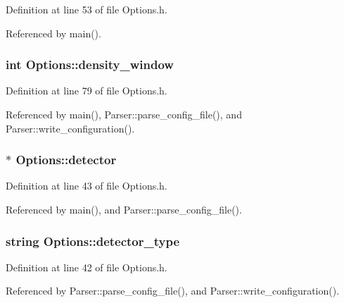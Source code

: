 \-Definition at line 53 of file \-Options.\-h.



\-Referenced by main().

\hypertarget{class_options_adbdf2cb66ca801f754de4299fb6e499a}{
\subsubsection[{density\-\_\-window}]{\setlength{\rightskip}{0pt plus 5cm}int {\bf \-Options\-::density\-\_\-window}}}
\label{class_options_adbdf2cb66ca801f754de4299fb6e499a}


\-Definition at line 79 of file \-Options.\-h.



\-Referenced by main(), \-Parser\-::parse\-\_\-config\-\_\-file(), and \-Parser\-::write\-\_\-configuration().

\hypertarget{class_options_ad830e7ecedc377b3536ed4c2e013a2dd}{
\subsubsection[{detector}]{$\ast$ {\bf \-Options\-::detector}}}
\label{class_options_ad830e7ecedc377b3536ed4c2e013a2dd}


\-Definition at line 43 of file \-Options.\-h.



\-Referenced by main(), and \-Parser\-::parse\-\_\-config\-\_\-file().

\hypertarget{class_options_a6536c55b2f8fc227d0fad5a2bdcf86b9}{
\subsubsection[{detector\-\_\-type}]{\setlength{\rightskip}{0pt plus 5cm}string {\bf \-Options\-::detector\-\_\-type}}}
\label{class_options_a6536c55b2f8fc227d0fad5a2bdcf86b9}


\-Definition at line 42 of file \-Options.\-h.



\-Referenced by \-Parser\-::parse\-\_\-config\-\_\-file(), and \-Parser\-::write\-\_\-configuration().

